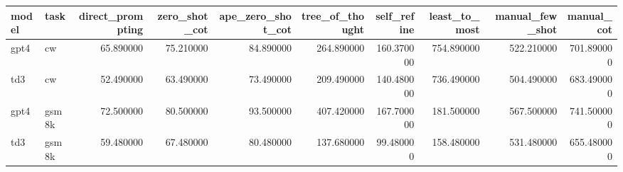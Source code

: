 \begin{tabular}{llrrrrrrrr}
\toprule
model & task & direct_prompting & zero_shot_cot & ape_zero_shot_cot & tree_of_thought & self_refine & least_to_most & manual_few_shot & manual_cot \\
\midrule
gpt4 & cw & 65.890000 & 75.210000 & 84.890000 & 264.890000 & 160.370000 & 754.890000 & 522.210000 & 701.890000 \\
td3 & cw & 52.490000 & 63.490000 & 73.490000 & 209.490000 & 140.480000 & 736.490000 & 504.490000 & 683.490000 \\
gpt4 & gsm8k & 72.500000 & 80.500000 & 93.500000 & 407.420000 & 167.700000 & 181.500000 & 567.500000 & 741.500000 \\
td3 & gsm8k & 59.480000 & 67.480000 & 80.480000 & 137.680000 & 99.480000 & 158.480000 & 531.480000 & 655.480000 \\
\bottomrule
\end{tabular}
